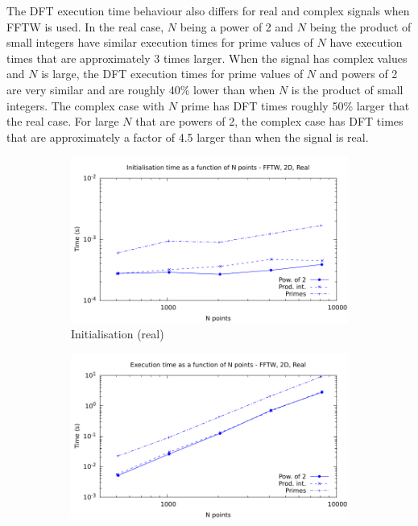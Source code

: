 \documentclass[12pt, a4paper]{article} \setlength{\textheight}{24cm}
\begin{document}
The DFT execution time behaviour also differs for real and complex
signals when FFTW is used. In the real case, $N$ being a power of 2
and $N$ being the product of small integers have similar execution
times for prime values of $N$ have execution times that are
approximately 3 times larger. When the signal has complex values and
$N$ is large, the DFT execution times for prime values of $N$ and
powers of 2 are very similar and are roughly 40\% lower than when $N$
is the product of small integers. The complex case with $N$ prime has
DFT times roughly 50\% larger that the real case. For large $N$ that
are powers of 2, the complex case has DFT times that are approximately
a factor of 4.5 larger than when the signal is real.

\begin{figure}[H]
  \captionsetup{width=0.8\linewidth}
  \centering
  \begin{subfigure}{.5\textwidth}
    \centering
    \includegraphics[width=.9\linewidth]{graphs/2d-fftw-init-r.pdf}
    \caption{Initialisation (real)}
    \label{2DFFTWRI}
  \end{subfigure}%
  \begin{subfigure}{.5\textwidth}
    \centering
    \includegraphics[width=.9\linewidth]{graphs/2d-fftw-exec-r.pdf}

\end{subfigure}
\end{figure}
\end{document}
